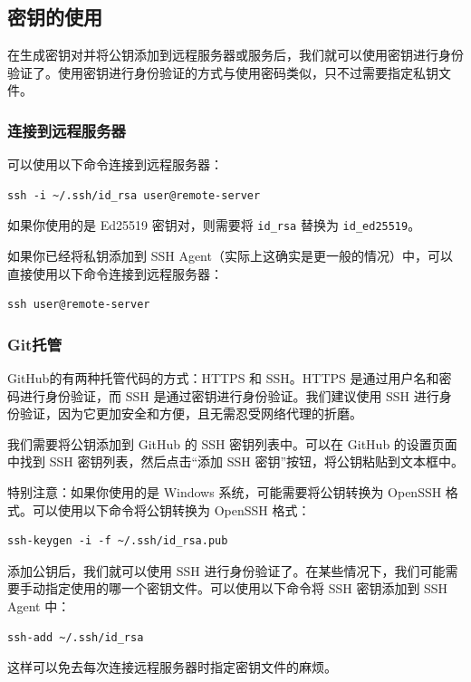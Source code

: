 \documentclass[../main.tex]{subfiles}
\begin{document}
\subsection{密钥的使用}

在生成密钥对并将公钥添加到远程服务器或服务后，我们就可以使用密钥进行身份验证了。使用密钥进行身份验证的方式与使用密码类似，只不过需要指定私钥文件。

\subsubsection{连接到远程服务器}

可以使用以下命令连接到远程服务器：
\begin{verbatim}
ssh -i ~/.ssh/id_rsa user@remote-server
\end{verbatim}
如果你使用的是 Ed25519 密钥对，则需要将 \texttt{id\_rsa} 替换为 \texttt{id\_ed25519}。

如果你已经将私钥添加到 SSH Agent（实际上这确实是更一般的情况）中，可以直接使用以下命令连接到远程服务器：
\begin{verbatim}
ssh user@remote-server
\end{verbatim}

\subsubsection{Git托管}

GitHub的有两种托管代码的方式：HTTPS 和 SSH。HTTPS 是通过用户名和密码进行身份验证，而 SSH 是通过密钥进行身份验证。我们建议使用 SSH 进行身份验证，因为它更加安全和方便，且无需忍受网络代理的折磨。

我们需要将公钥添加到 GitHub 的 SSH 密钥列表中。可以在 GitHub 的设置页面中找到 SSH 密钥列表，然后点击“添加 SSH 密钥”按钮，将公钥粘贴到文本框中。

特别注意：如果你使用的是 Windows 系统，可能需要将公钥转换为 OpenSSH 格式。可以使用以下命令将公钥转换为 OpenSSH 格式：
\begin{verbatim}
ssh-keygen -i -f ~/.ssh/id_rsa.pub
\end{verbatim}

添加公钥后，我们就可以使用 SSH 进行身份验证了。在某些情况下，我们可能需要手动指定使用的哪一个密钥文件。可以使用以下命令将 SSH 密钥添加到 SSH Agent 中：
\begin{verbatim}
ssh-add ~/.ssh/id_rsa
\end{verbatim}

这样可以免去每次连接远程服务器时指定密钥文件的麻烦。
\end{document}
